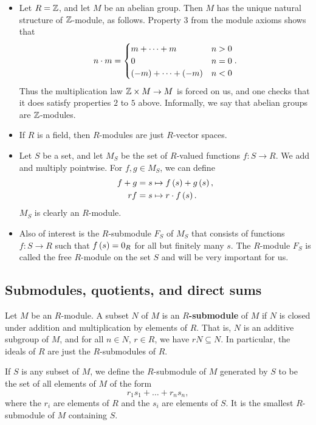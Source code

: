 \begin{example*}
\begin{itemize}
\item Let $ R = \mathbb{Z} $, and let $ M $ be an abelian group. Then $ M $ has the unique natural structure of $ \mathbb{Z} $-module, as follows. Property $ 3 $ from the module axioms shows that
$$ n \cdot m =
\begin{cases}
m + \dots + m & n > 0 \\
0 & n = 0 \\
\left( -m \right) + \dots + \left( -m \right) & n < 0
\end{cases}.
$$
Thus the multiplication law $ \mathbb{Z} \times M \to M $ is forced on us, and one checks that it does satisfy properties $ 2 $ to $ 5 $ above. Informally, we say that abelian groups are $ \mathbb{Z} $-modules.
\item If $ R $ is a field, then $ R $-modules are just $ R $-vector spaces.
\item Let $ S $ be a set, and let $ M_S $ be the set of $ R $-valued functions $ f : S \to R $. We add and multiply pointwise. For $ f, g \in M_S $, we can define
\begin{align*}
f + g & = s \mapsto f\left( s \right) + g\left( s \right), \\
rf & = s \mapsto r \cdot f\left( s \right).
\end{align*}
$ M_S $ is clearly an $ R $-module.
\item Also of interest is the $ R $-submodule $ F_S $ of $ M_S $ that consists of functions $ f : S \to R $ such that $ f\left( s \right) = 0_R $ for all but finitely many $ s $. The $ R $-module $ F_S $ is called the free $ R $-module on the set $ S $ and will be very important for us.
\end{itemize}
\end{example*}

\subsection{Submodules, quotients, and direct sums}

\begin{definition}
Let $ M $ be an $ R $-module. A subset $ N $ of $ M $ is an \textbf{$ R $-submodule} of $ M $ if $ N $ is closed under addition and multiplication by elements of $ R $. That is, $ N $ is an additive subgroup of $ M $, and for all $ n \in N $, $ r \in R $, we have $ rN \subseteq N $. In particular, the ideals of $ R $ are just the $ R $-submodules of $ R $.
\end{definition}

\begin{definition}
If $ S $ is any subset of $ M $, we define the $ R $-submodule of $ M $ generated by $ S $ to be the set of all elements of $ M $ of the form
$$ r_1s_1 + \dots + r_ns_n, $$
where the $ r_i $ are elements of $ R $ and the $ s_i $ are elements of $ S $. It is the smallest $ R $-submodule of $ M $ containing $ S $.
\end{definition}


